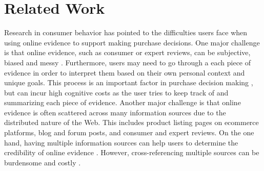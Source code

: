 \section{Related Work}

Research in consumer behavior has pointed to the difficulties users face when using online evidence to support making purchase decisions. One major challenge is that online evidence, such as consumer or expert reviews, can be subjective, biased and messy \cite{mudambi2010research,Howmerch65:online}. Furthermore, users may need to go through a each piece of evidence in order to interpret them based on their own personal context and unique goals. This process is an important factor in purchase decision making \cite{gan2012helpfulness,mudambi2010research}, but can incur high cognitive costs as the user tries to keep track of and summarizing each piece of evidence. Another major challenge is that online evidence is often scattered across many information sources due to the distributed nature of the Web. This includes product listing pages on ecommerce platforms, blog and forum posts, and consumer and expert reviews. On the one hand, having multiple information sources can help users to determine the credibility of online evidence \cite{hoch1986consumer, racherla2012perceived,zhang2012human,chen2015tripplanner}. However, cross-referencing multiple sources can be burdensome and costly \cite{o1996towards,marshall1999introducing,tashman2011liquidtext,bianchi2015designing}.



